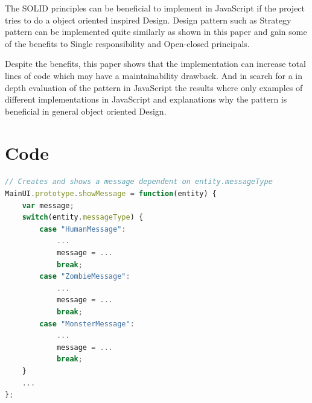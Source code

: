 \documentclass[conference, a4paper]{IEEEtran}
\begin{document}
The SOLID principles can be beneficial to implement in JavaScript if the project tries to do a object oriented inspired Design. Design pattern such as Strategy pattern can be implemented quite similarly as shown in this paper and gain some of the benefits to Single responsibility and Open-closed principals.

Despite the benefits, this paper shows that the implementation can increase total lines of code which may have a maintainability drawback. And in search for a in depth evaluation of the pattern in JavaScript the results where only examples of different implementations in JavaScript and explanations why the pattern is beneficial in general object oriented Design.

\clearpage
\section*{Code}

\begin{lstlisting}[language=JavaScript, label=lst:switch-case, caption=\texttt{MainUI.js} The original switch case.]
// Creates and shows a message dependent on entity.messageType
MainUI.prototype.showMessage = function(entity) {
	var message;
	switch(entity.messageType) {
		case "HumanMessage":
			...
			message = ...
			break;
		case "ZombieMessage":
			...
			message = ...
			break;
		case "MonsterMessage":
			...
			message = ...
			break;
	}
	...
};
\end{lstlisting}
\end{document}
